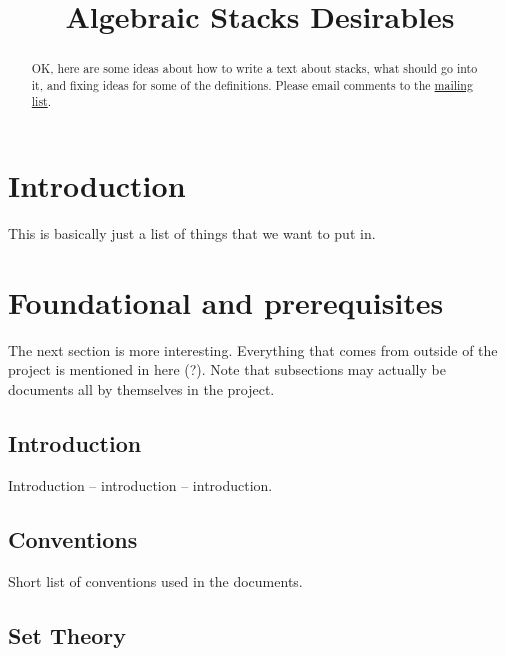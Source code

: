 \documentclass{amsart}
\theoremstyle{definition}
\theoremstyle{remark}
\numberwithin{equation}{subsection}
\begin{document}
\title{Algebraic Stacks Desirables}

\begin{abstract}
OK, here are some ideas about how to write a text about 
stacks, what should go into it, and fixing ideas for some
of the definitions. Please email comments to the
\href{http://www.math.columbia.edu/mailman/listinfo/algebraic_geometry}%
{mailing list}.
\end{abstract}

\maketitle
\thispagestyle{fancy}

\tableofcontents

\section{Introduction}
\label{section-introduction}

\noindent
This is basically just a list of things that we want to put in.

\section{Foundational and prerequisites}
\label{section-foundational}

\noindent
The next section is more interesting. Everything that comes from outside 
of the project is mentioned in here (?). Note that subsections may actually
be documents all by themselves in the project.

\subsection{Introduction}
\label{subsection-introduction}

\noindent
Introduction -- introduction -- introduction.

\subsection{Conventions}
\label{subsection-conventions}

\noindent
Short list of conventions used in the documents.

\subsection{Set Theory}
\label{subsection-set-theory}
\end{document}
